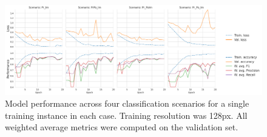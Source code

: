 \documentclass[Journal,letterpaper, SingleSpace, InsideFigs]{ascelike-new}
\begin{document}
\begin{figure}[ht]
    \centering
    \includegraphics[width=1.05\textwidth]{cnn-performance-metrics-128px-plot}
    \caption{Model performance across four classification scenarios for a single training instance in each case. Training resolution was 128px. All weighted average metrics were computed on the validation set.}
    \label{fig:cnn-perf}
\end{figure}
\end{document}
